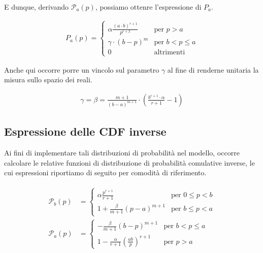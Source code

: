 \documentclass[paper=a4, fontsize=11pt]{scrartcl}
\numberwithin{equation}{section}
\numberwithin{figure}{section}
\numberwithin{table}{section}
\begin{document}
E dunque, derivando $\mathcal{P}_a(p)$, possiamo ottenre l'espressione di $P_a$.

\begin{align}
P_a(p) = \left\{\begin{array}{ll}
         \alpha  \frac{(a \cdot b)^{r+1}}{p^{r+2}}  & \text{per } p > a \\
         \gamma  \cdot (b - p)^m                    & \text{per } b < p \leq a \\
         0   & \text{altrimenti } \end{array}\right.
\end{align}

Anche qui occorre porre un vincolo sul parametro $\gamma$ al fine di renderne unitaria la misura sullo spazio dei reali.

\begin{align}
\gamma = \beta = \frac{m+1}{(b-a)^{m+1}} \cdot  \left(\frac{b^{r+1}\cdot\alpha}{r+1}-1\right)
\end{align}

\subsection{Espressione delle CDF inverse}

Ai fini di implementare tali distribuzioni di probabilità nel modello, occorre calcolare le relative funzioni di distribuzione di probabilità comulative inverse, le cui espressioni riportiamo di seguito per comodità di riferimento.

\begin{align}
\begin{split}
\mathcal{P}_b(p) &= \left\{ \begin{array}{ll}
         \alpha \frac{p^{r+1}}{r+1}          & \text{per } 0 \leq p < b \\
         1 + \frac{\beta}{m+1} (p-a)^{m+1}   & \text{per } b \leq p < a 
         \end{array}\right. \\
\mathcal{P}_a(p) &= \left\{ \begin{array}{ll}
         -\frac{\beta}{m+1} (b - p)^{m+1}    & \text{per } b < p \leq a \\
         1-\frac{\alpha}{r+1}
         \left(\frac{ab}{p}\right)^{r+1}     & \text{per } p > a
         \end{array}\right.
\end{split}
\end{align}
\end{document}
